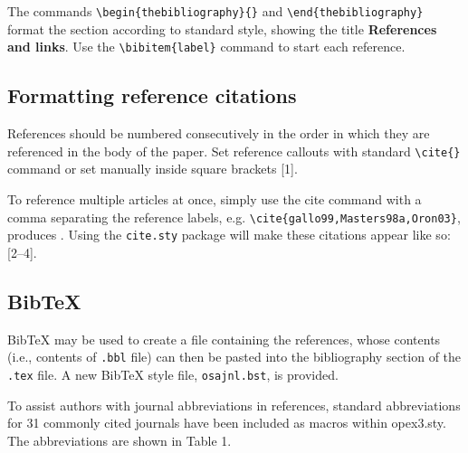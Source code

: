 \documentclass[10pt,letterpaper]{article}
\begin{document}
The commands \verb+\begin{thebibliography}{}+ and \verb+\end{thebibliography}+ format the section according to standard style, showing the title {\bf References and links}.  Use the \verb+\bibitem{label}+ command to start each reference.

\subsection{Formatting reference citations}
References should be numbered consecutively in the order in which they are referenced in the body of the paper. Set reference callouts with standard \verb+\cite{}+ command or set manually inside square brackets [1].

To reference multiple articles at once, simply use the cite command with a comma separating the reference labels, e.g. \verb+\cite{gallo99,Masters98a,Oron03}+, produces \cite{gallo99,Masters98a,Oron03}. Using the \texttt{cite.sty} package will make these citations appear like so: [2--4].

\subsection{Bib\TeX}
\label{sec:bibtex}
Bib\TeX{} may be used to create a file containing the references, whose contents (i.e., contents of \texttt{.bbl} file) can then be pasted into the bibliography section of the \texttt{.tex} file. A new Bib\TeX{} style file, \texttt{osajnl.bst}, is provided.

To assist authors with journal abbreviations in references, standard abbreviations for 31 commonly cited journals have been included as macros within opex3.sty.  The abbreviations are shown in Table 1.
\end{document}
